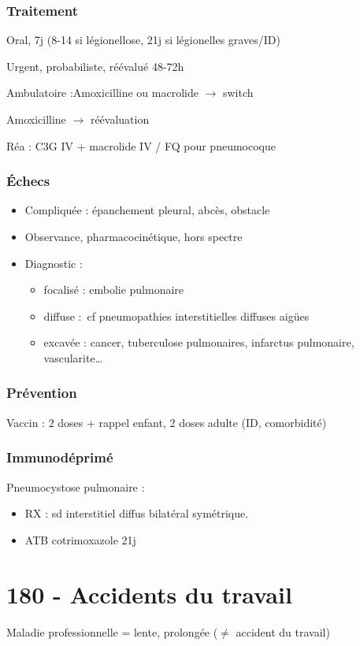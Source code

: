 \subsubsection{Traitement}
Oral, 7j (8-14 si légionellose, 21j si légionelles graves/ID)

Urgent, probabiliste, réévalué 48-72h

Ambulatoire :Amoxicilline ou macrolide \(\to\) switch

\faHospitalO  Amoxicilline \(\to\) réévaluation

Réa : C3G IV + macrolide IV / FQ pour pneumocoque

\subsubsection{Échecs}
\begin{itemize}
\item Compliquée : épanchement pleural, abcès, obstacle
\item Observance, pharmacocinétique, hors spectre
\item Diagnostic :
  \begin{itemize}
  \item focalisé : embolie pulmonaire
  \item diffuse : cf pneumopathies interstitielles diffuses aigües
  \item excavée : cancer, tuberculose pulmonaires, infarctus pulmonaire, vascularite\ldots{}
  \end{itemize}
\end{itemize}

\subsubsection{Prévention}
Vaccin : 2 doses + rappel enfant, 2 doses adulte (ID, comorbidité)

\subsubsection{Immunodéprimé}
Pneumocystose pulmonaire : 
\begin{itemize}
\item RX : sd interstitiel diffus bilatéral symétrique.
\item ATB cotrimoxazole 21j
\end{itemize}


\section{180 - Accidents du travail}
Maladie professionnelle = lente, prolongée (\(\neq\) accident du travail)
